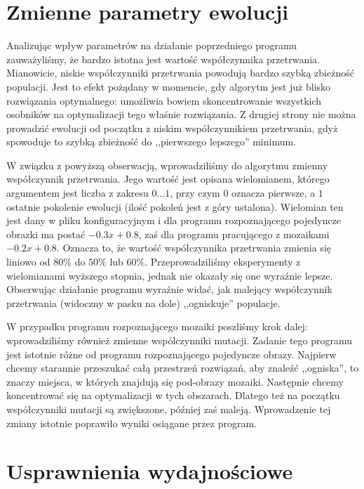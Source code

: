 \documentclass[a4paper,12pt,leqno]{article}
\begin{document}
\section{Zmienne parametry ewolucji}

Analizując wpływ parametrów na działanie poprzedniego programu zauważyliśmy, że bardzo istotna jest wartość współczynnika przetrwania. Mianowicie, niskie współczynniki przetrwania
powodują bardzo szybką zbieżność populacji. Jest to efekt pożądany w momencie, gdy algorytm jest już blisko rozwiązania optymalnego: umożliwia bowiem skoncentrowanie wszystkich
osobników na optymalizacji tego właśnie rozwiązania. Z drugiej strony nie można prowadzić ewolucji od początku z niskim współczynnikiem przetrwania, gdyż spowoduje to szybką
zbieżność do ,,pierwszego lepszego'' minimum.

W związku z powyższą obserwacją, wprowadziliśmy do algorytmu zmienny współczynnik przetrwania. Jego wartość jest opisana wielomianem, którego argumentem jest liczba z zakresu
$0 \dots 1$, przy czym $0$ oznacza pierwsze, a $1$ ostatnie pokolenie ewolucji (ilość pokoleń jest z góry ustalona). Wielomian ten jest dany w pliku konfiguracyjnym i dla programu
rozpoznającego pojedyncze obrazki ma postać $-0.3x + 0.8$, zaś dla programu pracującego z mozaikami $-0.2x + 0.8$. Oznacza to, że wartość współczynnika przetrwania zmienia się
liniowo od $80\%$ do $50\%$ lub $60\%$. Przeprowadziliśmy eksperymenty z wielomianami wyższego stopnia, jednak nie okazały się one wyraźnie lepsze. Obserwując działanie programu
wyraźnie widać, jak malejący współczynnik przetrwania (widoczny w pasku na dole) ,,ogniskuje'' populacje.

W przypadku programu rozpoznającego mozaiki poszliśmy krok dalej: wprowadziliśmy również zmienne wspólczynniki mutacji. Zadanie tego programu jest istotnie różne od programu
rozpoznającego pojedyncze obrazy. Najpierw chcemy starannie przeszukać całą przestrzeń rozwiązań, aby znaleźć ,,ogniska'', to znaczy miejsca, w których znajdują się pod-obrazy mozaiki.
Następnie chcemy koncentrować się na optymalizacji w tych obszarach. Dlatego też na początku współczynniki mutacji są zwiększone, później zaś maleją. Wprowadzenie tej zmiany istotnie
poprawiło wyniki osiągane przez program.

\section{Usprawnienia wydajnościowe}
\end{document}
